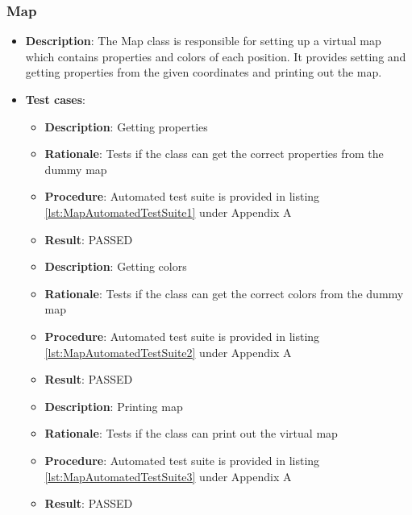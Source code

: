 \documentclass[12pt,a4paper]{article}
\begin{document}
    \subsubsection{Map}
	\begin{itemize}
	\item \textbf{Description}: The Map class is responsible for setting up a virtual map which contains properties and colors of each position.  It provides setting and getting properties from the given coordinates and printing out the map.
	\item \textbf{Test cases}:
	\begin{itemize}
		\item \textbf{Description}:	Getting properties
		\item \textbf{Rationale}: Tests if the class can get the correct properties from the dummy map
		\item \textbf{Procedure}: Automated test suite is provided in listing \ref{lst:MapAutomatedTestSuite1} under Appendix A
		\item \textbf{Result}: PASSED
	\end{itemize}
    \begin{itemize}
		\item \textbf{Description}:	Getting colors
		\item \textbf{Rationale}: Tests if the class can get the correct colors from the dummy map
		\item \textbf{Procedure}: Automated test suite is provided in listing \ref{lst:MapAutomatedTestSuite2} under Appendix A
		\item \textbf{Result}: PASSED
	\end{itemize}
    \begin{itemize}
		\item \textbf{Description}:	Printing map
		\item \textbf{Rationale}: Tests if the class can print out the virtual map
		\item \textbf{Procedure}: Automated test suite is provided in listing \ref{lst:MapAutomatedTestSuite3} under Appendix A
		\item \textbf{Result}: PASSED
	\end{itemize}
	\end{itemize}
    
\end{document}
